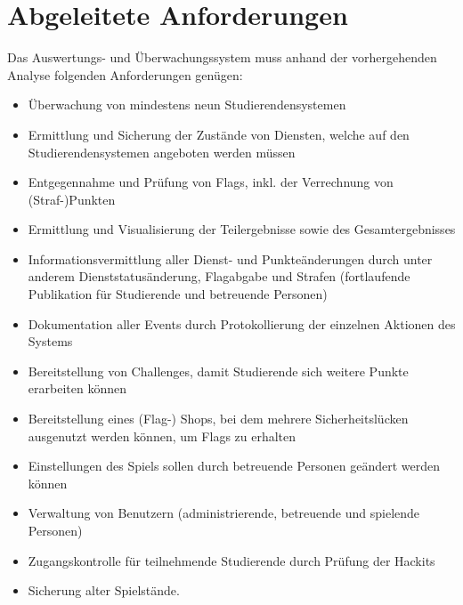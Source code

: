 \section{Abgeleitete Anforderungen}
\label{sec:Abgeleitete_Anforderungen}

Das Auswertungs- und Überwachungssystem muss anhand der vorhergehenden Analyse folgenden Anforderungen genügen:
\begin{itemize}
	\item Überwachung von mindestens neun Studierendensystemen
	\item Ermittlung und Sicherung der Zustände von Diensten, welche auf den Studierendensystemen angeboten werden müssen
	\item Entgegennahme und Prüfung von Flags, inkl. der Verrechnung von (Straf-)Punkten
	\item Ermittlung und Visualisierung der Teilergebnisse sowie des Gesamtergebnisses
	\item Informationsvermittlung aller Dienst- und Punkteänderungen durch unter anderem \linebreak Dienststatusänderung, Flagabgabe und Strafen (fortlaufende Publikation für Studierende und betreuende Personen)
	\item Dokumentation aller Events durch Protokollierung der einzelnen Aktionen des Systems
	\item Bereitstellung von Challenges, damit Studierende sich weitere Punkte erarbeiten können
	\item Bereitstellung eines (Flag-) Shops, bei dem mehrere Sicherheitslücken ausgenutzt werden können, um Flags zu erhalten
	\item Einstellungen des Spiels sollen durch betreuende Personen geändert werden können
	\item Verwaltung von Benutzern (administrierende, betreuende und spielende Personen)
	\item Zugangskontrolle für teilnehmende Studierende durch Prüfung der Hackits
	\item Sicherung alter Spielstände.
\end{itemize}